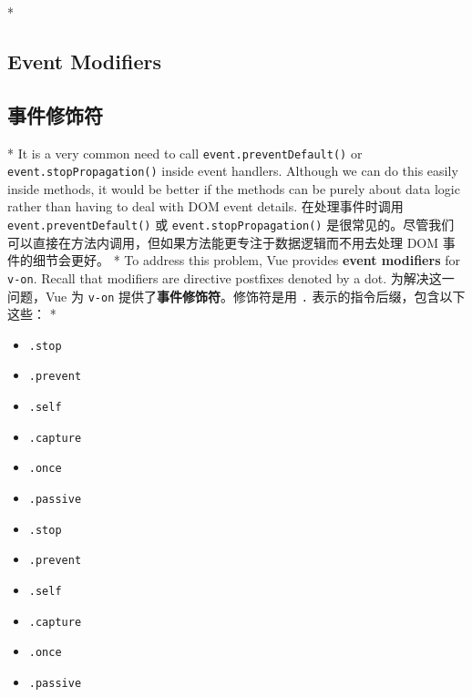 \begin{paracol}{2}

\switchcolumn[0]*%
\subsection{Event Modifiers}
\switchcolumn
\subsection{事件修饰符}
\switchcolumn[0]*%
It is a very common need to call \texttt{event.preventDefault()} or
\texttt{event.stopPropagation()} inside event handlers. Although we can
do this easily inside methods, it would be better if the methods can be
purely about data logic rather than having to deal with DOM event
details.
\switchcolumn
在处理事件时调用 \texttt{event.preventDefault()} 或
\texttt{event.stopPropagation()}
是很常见的。尽管我们可以直接在方法内调用，但如果方法能更专注于数据逻辑而不用去处理
DOM 事件的细节会更好。
\switchcolumn[0]*%
To address this problem, Vue provides \textbf{event modifiers} for
\texttt{v-on}. Recall that modifiers are directive postfixes denoted by
a dot.
\switchcolumn
为解决这一问题，Vue 为 \texttt{v-on}
提供了\textbf{事件修饰符}。修饰符是用 \texttt{.}
表示的指令后缀，包含以下这些：
\switchcolumn[0]*%
\begin{itemize}
\item
    \texttt{.stop}
\item
    \texttt{.prevent}
\item
    \texttt{.self}
\item
    \texttt{.capture}
\item
    \texttt{.once}
\item
    \texttt{.passive}
\end{itemize}
\switchcolumn
\begin{itemize}
\item
    \texttt{.stop}
\item
    \texttt{.prevent}
\item
    \texttt{.self}
\item
    \texttt{.capture}
\item
    \texttt{.once}
\item
    \texttt{.passive}
\end{itemize}



\end{paracol}
